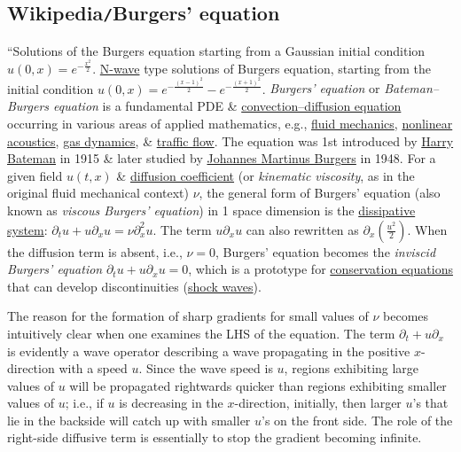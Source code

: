\documentclass{article}
\begin{document}

\subsection{Wikipedia{\tt/}Burgers' equation}
``{\sf Solutions of the Burgers equation starting from a Gaussian initial condition $u(0,x) = e^{-\frac{x^2}{2}}$. \href{https://en.wikipedia.org/wiki/N-wave}{N-wave} type solutions of Burgers equation, starting from the initial condition $u(0,x) = e^{-\frac{(x - 1)^2}{2}} - e^{-\frac{(x + 1)^2}{2}}$.} {\it Burgers' equation} or {\it Bateman--Burgers equation} is a fundamental PDE \& \href{https://en.wikipedia.org/wiki/Convection%E2%80%93diffusion_equation}{convection--diffusion equation} occurring in various areas of applied mathematics, e.g., \href{https://en.wikipedia.org/wiki/Fluid_mechanics}{fluid mechanics}, \href{https://en.wikipedia.org/wiki/Nonlinear_acoustics}{nonlinear acoustics}, \href{https://en.wikipedia.org/wiki/Gas_dynamics}{gas dynamics}, \& \href{https://en.wikipedia.org/wiki/Traffic_flow}{traffic flow}. The equation was 1st introduced by \href{https://en.wikipedia.org/wiki/Harry_Bateman}{\sc Harry Bateman} in 1915 \& later studied by \href{https://en.wikipedia.org/wiki/Johannes_Martinus_Burgers}{\sc Johannes Martinus Burgers} in 1948. For a given field $u(t,x)$ \& \href{https://en.wikipedia.org/wiki/Diffusion_coefficient}{diffusion coefficient} (or {\it kinematic viscosity}, as in the original fluid mechanical context) $\nu$, the general form of Burgers' equation (also known as {\it viscous Burgers' equation}) in 1 space dimension is the \href{https://en.wikipedia.org/wiki/Dissipative_system}{dissipative system}: $\partial_tu + u\partial_xu = \nu\partial_x^2u$. The term $u\partial_xu$ can also rewritten as $\partial_x\left(\frac{u^2}{2}\right)$. When the diffusion term is absent, i.e., $\nu = 0$, Burgers' equation becomes the {\it inviscid Burgers' equation} $\partial_tu + u\partial_xu = 0$, which is a prototype for \href{https://en.wikipedia.org/wiki/Conservation_law}{conservation equations} that can develop discontinuities (\href{https://en.wikipedia.org/wiki/Shock_wave}{shock waves}).

The reason for the formation of sharp gradients for small values of $\nu$ becomes intuitively clear when one examines the LHS of the equation. The term $\partial_t + u\partial_x$ is evidently a wave operator describing a wave propagating in the positive $x$-direction with a speed $u$. Since the wave speed is $u$, regions exhibiting large values of $u$ will be propagated rightwards quicker than regions exhibiting smaller values of $u$; i.e., if $u$ is decreasing in the $x$-direction, initially, then larger $u$'s that lie in the backside will catch up with smaller $u$'s on the front side. The role of the right-side diffusive term is essentially to stop the gradient becoming infinite.
\end{document}
